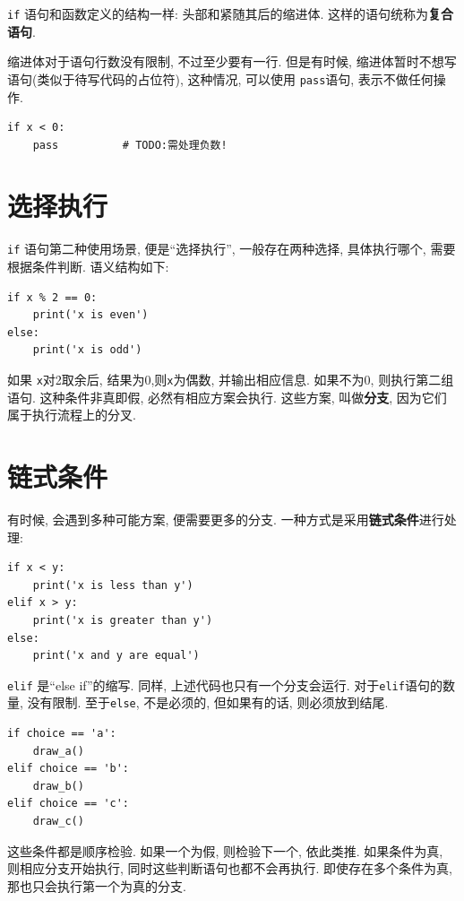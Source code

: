 \documentclass[10pt]{book}
\begin{document}
{\tt if} 语句和函数定义的结构一样: 头部和紧随其后的缩进体. 
这样的语句统称为{\bf 复合语句}.

缩进体对于语句行数没有限制, 不过至少要有一行. 
但是有时候, 缩进体暂时不想写语句(类似于待写代码的占位符), 
这种情况, 可以使用 {\tt pass}语句, 表示不做任何操作.

\begin{verbatim}
if x < 0:
    pass          # TODO:需处理负数!
\end{verbatim}
%

\section{选择执行}
\label{alternative.execution}
{\tt if} 语句第二种使用场景, 便是``选择执行'',
一般存在两种选择, 具体执行哪个, 需要根据条件判断. 
语义结构如下:

\begin{verbatim}
if x % 2 == 0:
    print('x is even')
else:
    print('x is odd')
\end{verbatim}
%
如果 {\tt x}对2取余后, 结果为0,则{\tt x}为偶数, 并输出相应信息. 
如果不为0, 则执行第二组语句. 
这种条件非真即假, 必然有相应方案会执行. 这些方案, 叫做{\bf 分支}, 
因为它们属于执行流程上的分叉. 



\section{链式条件}
有时候, 会遇到多种可能方案, 便需要更多的分支. 
一种方式是采用{\bf 链式条件}进行处理:

\begin{verbatim}
if x < y:
    print('x is less than y')
elif x > y:
    print('x is greater than y')
else:
    print('x and y are equal')
\end{verbatim}
%
{\tt elif}  是``else if''的缩写. 同样, 上述代码也只有一个分支会运行. 
对于{\tt elif}语句的数量, 没有限制. 
至于{\tt else}, 不是必须的, 但如果有的话, 则必须放到结尾.

\begin{verbatim}
if choice == 'a':
    draw_a()
elif choice == 'b':
    draw_b()
elif choice == 'c':
    draw_c()
\end{verbatim}
%
这些条件都是顺序检验. 如果一个为假, 则检验下一个, 依此类推. 
如果条件为真, 则相应分支开始执行, 同时这些判断语句也都不会再执行. 
即使存在多个条件为真, 那也只会执行第一个为真的分支.  
\end{document}
